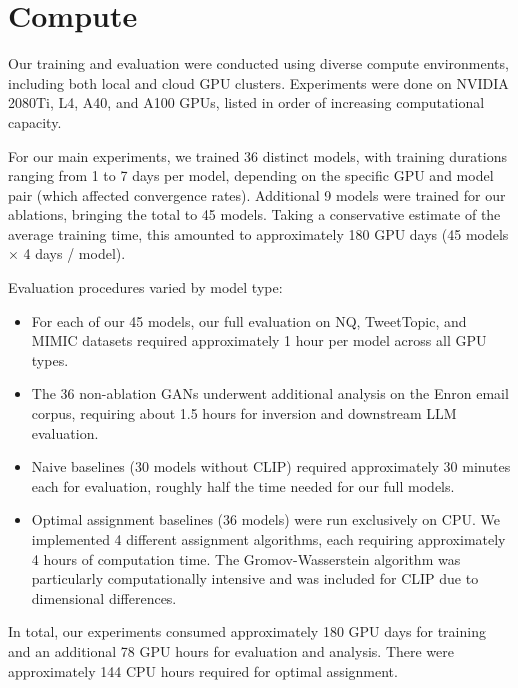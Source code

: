 \section{Compute}
Our training and evaluation were conducted using diverse compute environments, including both local and cloud GPU clusters. Experiments were done on NVIDIA 2080Ti, L4, A40, and A100 GPUs, listed in order of increasing computational capacity.

For our main experiments, we trained 36 distinct \atk{} models, with training durations ranging from 1 to 7 days per model, depending on the specific GPU and model pair (which affected convergence rates).  Additional 9 \atk{} models were trained for our ablations, bringing the total to 45 \atk{} models. Taking a conservative estimate of the average training time, this amounted to approximately 180 GPU days (45 models $\times$ 4 days / model).

Evaluation procedures varied by model type:
\begin{itemize}
    \item For each of our 45 \atk{} models, our full evaluation on NQ, TweetTopic, and MIMIC datasets required approximately 1 hour per model across all GPU types.
    \item The 36 non-ablation GANs underwent additional analysis on the Enron email corpus, requiring about 1.5 hours for inversion and downstream LLM evaluation.
    \item Naive baselines (30 models without CLIP) required approximately 30 minutes each for evaluation, roughly half the time needed for our full models.
    \item Optimal assignment baselines (36 models) were run exclusively on CPU. We implemented 4 different assignment algorithms, each requiring approximately 4 hours of computation time. The Gromov-Wasserstein algorithm was particularly computationally intensive and was included for CLIP due to dimensional differences.
\end{itemize}

In total, our experiments consumed approximately 180 GPU days for training and an additional 78 GPU hours for evaluation and analysis. There were approximately 144 CPU hours required for optimal assignment.



